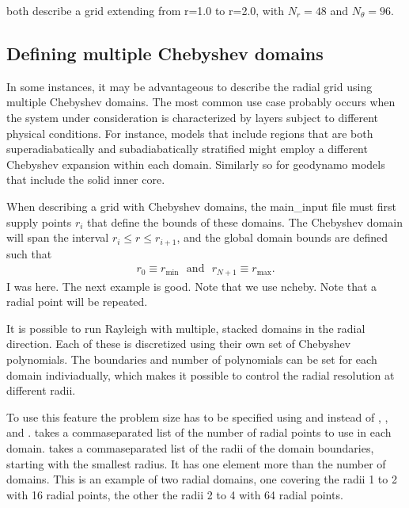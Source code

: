 \documentclass[letterpaper,11pt,english]{sphinxmanual}
\begin{document}
\sphinxAtStartPar
both describe a grid extending from r=1.0 to r=2.0, with \(N_r=48\) and \(N_\theta=96\).


\subsection{Defining multiple Chebyshev domains}
\label{\detokenize{doc/source/Model_Setup/grid_specification:defining-multiple-chebyshev-domains}}
\sphinxAtStartPar
In some instances, it may be advantageous to describe the radial grid using
multiple Chebyshev domains.  The most common use case probably occurs
when the system under consideration is characterized by layers
subject to different physical conditions.  For instance, models that
include regions that are both superadiabatically and subadiabatically stratified
might employ a different Chebyshev expansion within each domain.  Similarly so
for geodynamo models that include the solid inner core.

\sphinxAtStartPar
When describing a grid with  Chebyshev domains, the main\_input file must first
supply  points \(r_i\) that define the bounds of these domains.
The  Chebyshev domain will span the interval \(r_i \le r \le r_{i+1}\), and the global domain bounds
are defined such that
\begin{equation*}
\begin{split}r_0 \equiv r_\mathrm{min}\,\,\,\,\mathrm{and}\,\,\,\,r_{N+1}\equiv r_\mathrm{max}.\end{split}
\end{equation*}
\sphinxAtStartPar
I was here.  The next example is good.  Note that we use ncheby.  Note that a radial point will be repeated.

\sphinxAtStartPar
It is possible to run Rayleigh with multiple, stacked domains in the
radial direction. Each of these is discretized using their own set of
Chebyshev polynomials. The boundaries and number of polynomials can be
set for each domain indiviadually, which makes it possible to control
the radial resolution at different radii.

\sphinxAtStartPar
To use this feature the problem size has to be specified using
 and  instead of , , and
.  takes a comma\sphinxhyphen{}separated list of the number of radial
points to use in each domain.  takes a comma\sphinxhyphen{}separated
list of the radii of the domain boundaries, starting with the smallest
radius. It has one element more than the number of domains. This is an
example of two radial domains, one covering the radii 1 to 2 with 16
radial points, the other the radii 2 to 4 with 64 radial points.
\end{document}
